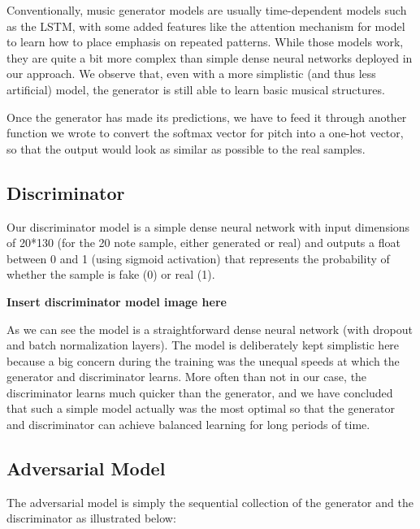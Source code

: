\documentclass[12pt,oneside]{chicagocapstone}
\begin{document}
Conventionally, music generator models are usually time-dependent models such as the LSTM, with some added features like the attention mechanism for model to learn how to place emphasis on repeated patterns. While those models work, they are quite a bit more complex than simple dense neural networks deployed in our approach. We observe that, even with a more simplistic (and thus less artificial) model, the generator is still able to learn basic musical structures.

Once the generator has made its predictions, we have to feed it through another function we wrote to convert the softmax vector for pitch into a one-hot vector, so that the output would look as similar as possible to the real samples.

\hypertarget{discriminator}{%
\subsection*{Discriminator}\label{discriminator}}

Our discriminator model is a simple dense neural network with input dimensions of 20*130 (for the 20 note sample, either generated or real) and outputs a float between 0 and 1 (using sigmoid activation) that represents the probability of whether the sample is fake (0) or real (1).

\textbf{Insert discriminator model image here}

As we can see the model is a straightforward dense neural network (with dropout and batch normalization layers). The model is deliberately kept simplistic here because a big concern during the training was the unequal speeds at which the generator and discriminator learns. More often than not in our case, the discriminator learns much quicker than the generator, and we have concluded that such a simple model actually was the most optimal so that the generator and discriminator can achieve balanced learning for long periods of time.

\hypertarget{adversarial-model}{%
\subsection*{Adversarial Model}\label{adversarial-model}}

The adversarial model is simply the sequential collection of the generator and the discriminator as illustrated below:
\end{document}
